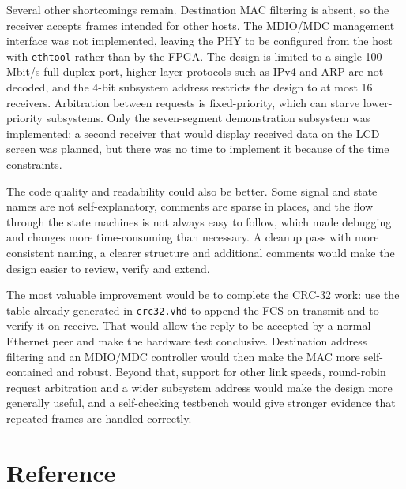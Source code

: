 \documentclass[11pt,a4paper]{article}
\begin{document}
Several other shortcomings remain. Destination MAC filtering is absent, so the receiver accepts frames intended for other hosts. The MDIO/MDC management interface was not implemented, leaving the PHY to be configured from the host with \texttt{ethtool} rather than by the FPGA. The design is limited to a single 100\,Mbit/s full-duplex port, higher-layer protocols such as IPv4 and ARP are not decoded, and the 4-bit subsystem address restricts the design to at most 16 receivers. Arbitration between requests is fixed-priority, which can starve lower-priority subsystems. Only the seven-segment demonstration subsystem was implemented: a second receiver that would display received data on the LCD screen was planned, but there was no time to implement it because of the time constraints.

The code quality and readability could also be better. Some signal and state names are not self-explanatory, comments are sparse in places, and the flow through the state machines is not always easy to follow, which made debugging and changes more time-consuming than necessary. A cleanup pass with more consistent naming, a clearer structure and additional comments would make the design easier to review, verify and extend.

The most valuable improvement would be to complete the CRC-32 work: use the table already generated in \texttt{crc32.vhd} to append the FCS on transmit and to verify it on receive. That would allow the reply to be accepted by a normal Ethernet peer and make the hardware test conclusive. Destination address filtering and an MDIO/MDC controller would then make the MAC more self-contained and robust. Beyond that, support for other link speeds, round-robin request arbitration and a wider subsystem address would make the design more generally useful, and a self-checking testbench would give stronger evidence that repeated frames are handled correctly.

\newpage

\section*{Reference}
\end{document}

